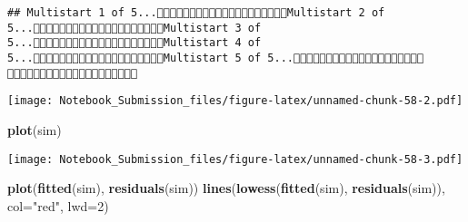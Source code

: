 \documentclass[
]{article}
\newenvironment{Shaded}{\begin{snugshade}}{\end{snugshade}}
\newcommand{\DataTypeTok}[1]{\textcolor[rgb]{0.13,0.29,0.53}{#1}}
\newcommand{\DecValTok}[1]{\textcolor[rgb]{0.00,0.00,0.81}{#1}}
\newcommand{\KeywordTok}[1]{\textcolor[rgb]{0.13,0.29,0.53}{\textbf{#1}}}
\newcommand{\NormalTok}[1]{#1}
\newcommand{\OperatorTok}[1]{\textcolor[rgb]{0.81,0.36,0.00}{\textbf{#1}}}
\newcommand{\StringTok}[1]{\textcolor[rgb]{0.31,0.60,0.02}{#1}}
\begin{document}
\begin{verbatim}
## Multistart 1 of 5...Multistart 2 of 5...Multistart 3 of 5...Multistart 4 of 5...Multistart 5 of 5...                    
\end{verbatim}

\begin{Shaded}
\end{Shaded}

\texttt{[image: Notebook\_Submission\_files/figure-latex/unnamed-chunk-58-2.pdf]}

\begin{Shaded}
\begin{Highlighting}[]
\KeywordTok{plot}\NormalTok{(sim)}
\end{Highlighting}
\end{Shaded}

\texttt{[image: Notebook\_Submission\_files/figure-latex/unnamed-chunk-58-3.pdf]}

\begin{Shaded}
\begin{Highlighting}[]
\KeywordTok{plot}\NormalTok{(}\KeywordTok{fitted}\NormalTok{(sim), }\KeywordTok{residuals}\NormalTok{(sim))}
\KeywordTok{lines}\NormalTok{(}\KeywordTok{lowess}\NormalTok{(}\KeywordTok{fitted}\NormalTok{(sim), }\KeywordTok{residuals}\NormalTok{(sim)), }\DataTypeTok{col=}\StringTok{"red"}\NormalTok{, }\DataTypeTok{lwd=}\DecValTok{2}\NormalTok{)}
\end{Highlighting}
\end{Shaded}
\end{document}

